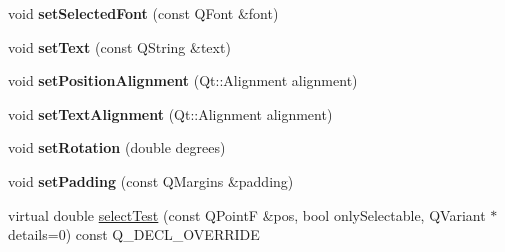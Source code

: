\begin{DoxyCompactItemize}
\item 
void {\bfseries set\+Selected\+Font} (const Q\+Font \&font)\hypertarget{class_q_c_p_item_text_a0be2841772f83663c4db307928b82816}{}\label{class_q_c_p_item_text_a0be2841772f83663c4db307928b82816}

\item 
void {\bfseries set\+Text} (const Q\+String \&text)\hypertarget{class_q_c_p_item_text_a3dacdda0ac88f99a05b333b977c48747}{}\label{class_q_c_p_item_text_a3dacdda0ac88f99a05b333b977c48747}

\item 
void {\bfseries set\+Position\+Alignment} (Qt\+::\+Alignment alignment)\hypertarget{class_q_c_p_item_text_a781cdf8c640fc6a055dcff1e675c8c7a}{}\label{class_q_c_p_item_text_a781cdf8c640fc6a055dcff1e675c8c7a}

\item 
void {\bfseries set\+Text\+Alignment} (Qt\+::\+Alignment alignment)\hypertarget{class_q_c_p_item_text_ab5bc0684c4d1bed81949a11b34dba478}{}\label{class_q_c_p_item_text_ab5bc0684c4d1bed81949a11b34dba478}

\item 
void {\bfseries set\+Rotation} (double degrees)\hypertarget{class_q_c_p_item_text_a4bcc10cd97952c3f749d75824b5077f0}{}\label{class_q_c_p_item_text_a4bcc10cd97952c3f749d75824b5077f0}

\item 
void {\bfseries set\+Padding} (const Q\+Margins \&padding)\hypertarget{class_q_c_p_item_text_aeea8a3e01f135f9dd0bb08f51db66310}{}\label{class_q_c_p_item_text_aeea8a3e01f135f9dd0bb08f51db66310}

\item 
virtual double \hyperlink{class_q_c_p_item_text_ab9d7938a7445f16a00391e9355a5ceaa}{select\+Test} (const Q\+PointF \&pos, bool only\+Selectable, Q\+Variant $\ast$details=0) const Q\+\_\+\+D\+E\+C\+L\+\_\+\+O\+V\+E\+R\+R\+I\+DE
\end{DoxyCompactItemize}

